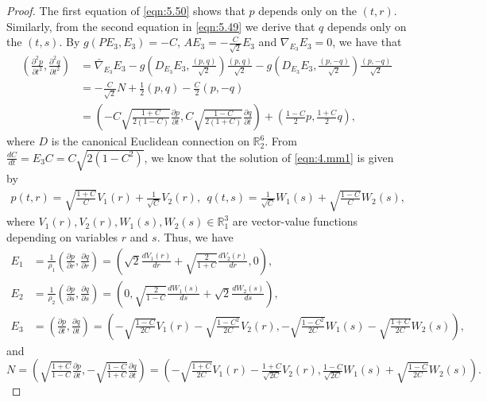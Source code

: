 \documentclass[10pt,a4paper]{amsart}
\begin{document}
\begin{proof}
The first equation of \eqref{eqn:5.50} shows that $p$ depends only on the $(t,r)$.
Similarly, from the second equation in \eqref{eqn:5.49} we derive that $q$ depends only on
the $(t,s)$. By $g(PE_3,E_3)=-C$, $AE_3=-\frac{C}{\sqrt{2}}E_3$ and $\nabla_{E_3}{E_3}=0$,
we have that
\begin{equation}\label{eqn:4.mm1}
\begin{aligned}
(\tfrac{\partial^2 p}{\partial t^2},\tfrac{\partial^2 q}{\partial t^2})&%
=\bar{\nabla}_{E_3}{E_3}-g( D_{E_3}{E_3},\tfrac{(p,q)}{\sqrt{2}})\tfrac{(p,q)}{\sqrt{2}}
-g( D_{E_3}{E_3},\tfrac{(p,-q)}{\sqrt{2}})\tfrac{(p,-q)}{\sqrt{2}}\\
&=-\tfrac{C}{\sqrt{2}}N+\tfrac{1}{2}(p,q)-\tfrac{C}{2}(p,-q)\\
&=(-C\sqrt{\tfrac{1+C}{2(1-C)}}\tfrac{\partial p}{\partial t},C\sqrt{\tfrac{1-C}{2(1+C)}}\tfrac{\partial q}{\partial t})+(\tfrac{1-C}{2}p,\tfrac{1+C}{2}q),
\end{aligned}
\end{equation}
where $D$ is the canonical Euclidean connection on $\mathbb{R}_2^6$.
From $\frac{dC}{dt}=E_3C=C\sqrt{2(1-C^2)}$, we know that the solution of
\eqref{eqn:4.mm1} is given by
\begin{equation}\label{eqn:pq}
\begin{aligned}
p(t,r)=\sqrt{\tfrac{1+C}{C}}V_1(r)+\tfrac{1}{\sqrt{C}}V_2(r),\ \
q(t,s)=\tfrac{1}{\sqrt{C}}W_1(s)+\sqrt{\tfrac{1-C}{C}}W_2(s),
\end{aligned}
\end{equation}
where $V_1(r),V_2(r),W_1(s),W_2(s)\in \mathbb{R}_1^3$ are vector-value functions depending on variables $r$ and $s$. Thus, we have
$$
\begin{aligned}
E_1&=\tfrac{1}{\rho_1}(\tfrac{\partial p}{\partial r},\tfrac{\partial q}{\partial r})
=(\sqrt{2}\tfrac{d V_1(r)}{dr}+\sqrt{\tfrac{2}{1+C}}\tfrac{d V_2(r)}{dr},0),\\
E_2&=\tfrac{1}{\rho_2}(\tfrac{\partial p}{\partial s},\tfrac{\partial q}{\partial s})
=(0,\sqrt{\tfrac{2}{1-C}}\tfrac{d W_1(s)}{ds}+\sqrt{2}\tfrac{d W_2(s)}{ds}),\\
E_3&=(\tfrac{\partial p}{\partial t},\tfrac{\partial q}{\partial t})
=(-\sqrt{\tfrac{1-C}{2C}}V_1(r)-\sqrt{\tfrac{1-C^2}{2C}}V_2(r),
-\sqrt{\tfrac{1-C^2}{2C}}W_1(s)-\sqrt{\tfrac{1+C}{2C}}W_2(s)),
\end{aligned}
$$
and
$$
N=(\sqrt{\tfrac{1+C}{1-C}}\tfrac{\partial p}{\partial t},-\sqrt{\tfrac{1-C}{1+C}}\tfrac{\partial q}{\partial t})
=(-\sqrt{\tfrac{1+C}{2C}}V_1(r)-\tfrac{1+C}{\sqrt{2C}}V_2(r),
\tfrac{1-C}{\sqrt{2C}}W_1(s)+\sqrt{\tfrac{1-C}{2C}}W_2(s)).
$$




\end{proof}
\end{document}
